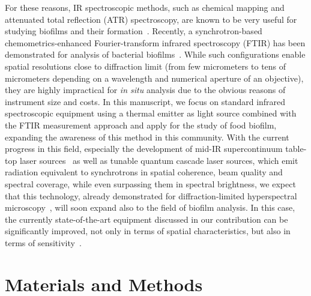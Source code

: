 \documentclass[foods,article,submit,moreauthors,pdftex]{Definitions/mdpi}
\begin{document}
For these reasons, IR spectroscopic methods, such as chemical mapping and attenuated total reflection (ATR) spectroscopy, are known to be very useful for studying biofilms and their formation~\cite{ojeda_analysis_2009,Ojeda2012,reuben_combination_2014}. Recently, a synchrotron-based chemometrics-enhanced Fourier-transform infrared spectroscopy (FTIR) has been demonstrated for analysis of bacterial biofilms~\cite{molecules26133890}. While such configurations enable spatial resolutions close to diffraction limit (from few micrometers to tens of micrometers depending on a wavelength and numerical aperture of an objective), they are highly impractical for \textit{in situ} analysis due to the obvious reasons of instrument size and costs. In this manuscript, we focus on standard infrared spectroscopic equipment using a thermal emitter as light source combined with the FTIR measurement approach and apply for the study of food biofilm, expanding the awareness of this method in this community. With the current progress in this field, especially the development of mid-IR supercontinuum table-top laser sources~\cite{PETERSEN2018182} as well as tunable quantum cascade laser sources, which emit radiation equivalent to synchrotrons in spatial coherence, beam quality and spectral coverage, while even surpassing them in spectral brightness, we expect that this technology, already demonstrated for diffraction-limited hyperspectral microscopy~\cite{Kilgus:18}, will soon expand also to the field of biofilm analysis. In this case, the currently state-of-the-art equipment discussed in our contribution can be significantly improved, not only in terms of spatial characteristics, but also in terms of sensitivity~\cite{d0003702819893364oi:10.1177/}.





\section{Materials and Methods}
\end{document}
